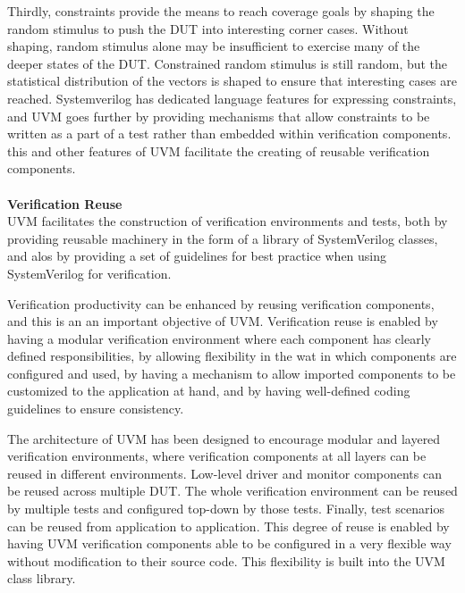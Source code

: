 \documentclass[a4paper,11pt]{article}
\begin{document}
Thirdly, constraints provide the means to reach coverage goals by shaping the random stimulus to push the DUT into interesting corner cases. Without shaping, random stimulus alone may be insufficient to exercise many of the deeper states of the DUT. Constrained random stimulus is still random, but the statistical distribution of the vectors is shaped to ensure that interesting cases are reached. Systemverilog has dedicated language features for expressing constraints, and UVM goes further by providing mechanisms that allow constraints to be written as a part of a test rather than embedded within verification components. this and other features of UVM facilitate the creating of reusable verification components.\cite{doulos1}
\ \\
\ \\
\textbf{Verification Reuse}
\ \\
UVM facilitates the construction of verification environments and tests, both by providing reusable machinery in the form of a library of SystemVerilog classes, and alos by providing a set of guidelines for best practice when using SystemVerilog for verification.\cite{doulos1}

Verification productivity can be enhanced by reusing verification components, and this is an an important objective of UVM. Verification reuse is enabled by having a modular verification environment where each component has clearly defined responsibilities, by allowing flexibility in the wat in which components are configured and used, by having a mechanism to allow imported components to be customized to the application at hand, and by having well-defined coding guidelines to ensure consistency.\cite{doulos1}

The architecture of UVM has been designed to encourage modular and layered verification environments, where verification components at all layers can be reused in different environments. Low-level driver and monitor components can be reused across multiple DUT. The whole verification environment can be reused by multiple tests and configured top-down by those tests. Finally, test scenarios can be reused from application to application. This degree of reuse is enabled by having UVM verification components able to be configured in a very flexible way without modification to their source code. This flexibility is built into the UVM class library.\cite{doulos1}

\newpage
\pagebreak
\end{document}
